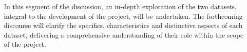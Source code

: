 

\newcommand{\cifar}{\href{https://www.cs.toronto.edu/~kriz/cifar.html}{\texttt{cs.toronto.edu/\string~kriz/cifar.html}}}
\newcommand{\scaledcifar}{\href{https://www.kaggle.com/datasets/joaopauloschuler/cifar10-64x64-resized-via-cai-super-resolution}{\texttt{kaggle.com/datasets/joaopauloschuler/cifar10-64x64-resized-via-cai-super-resolution}}}
\newcommand{\coco}{\href{https://cocodataset.org/}{\texttt{cocodataset.org}}}

In this segment of the discussion, an in-depth exploration of the two datasets, integral to the development of the project, will be undertaken. The forthcoming discourse will clarify the specifics, characteristics and distinctive aspects of each dataset, delivering a comprehensive understanding of their role within the scope of the project.


